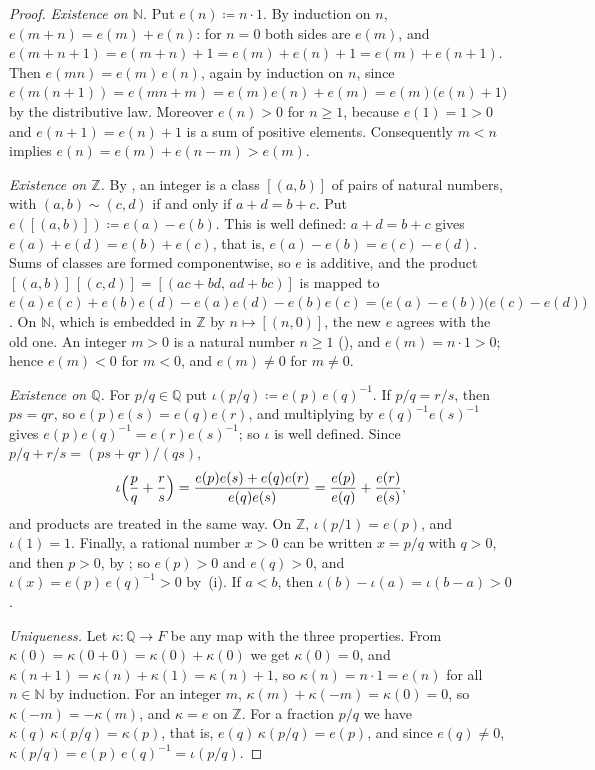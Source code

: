 \begin{proof}
\emph{Existence on $\mathbb N$.} Put $e(n)\coloneqq n\cdot1$. By induction on $n$, $e(m+n)=e(m)+e(n)$: for $n=0$ both sides are $e(m)$, and $e(m+n+1)=e(m+n)+1=e(m)+e(n)+1=e(m)+e(n+1)$. Then $e(mn)=e(m)\,e(n)$, again by induction on $n$, since $e(m(n+1))=e(mn+m)=e(m)e(n)+e(m)=e(m)\bigl(e(n)+1\bigr)$ by the distributive law. Moreover $e(n)>0$ for $n\ge1$, because $e(1)=1>0$ and $e(n+1)=e(n)+1$ is a sum of positive elements. Consequently $m<n$ implies $e(n)=e(m)+e(n-m)>e(m)$.

\emph{Existence on $\mathbb Z$.} By , an integer is a class $[(a,b)]$ of pairs of natural numbers, with $(a,b)\sim(c,d)$ if and only if $a+d=b+c$. Put $e([(a,b)])\coloneqq e(a)-e(b)$. This is well defined: $a+d=b+c$ gives $e(a)+e(d)=e(b)+e(c)$, that is, $e(a)-e(b)=e(c)-e(d)$. Sums of classes are formed componentwise, so $e$ is additive, and the product $[(a,b)]\,[(c,d)]=[(ac+bd,\,ad+bc)]$ is mapped to $e(a)e(c)+e(b)e(d)-e(a)e(d)-e(b)e(c)=\bigl(e(a)-e(b)\bigr)\bigl(e(c)-e(d)\bigr)$. On $\mathbb N$, which is embedded in $\mathbb Z$ by $n\mapsto[(n,0)]$, the new $e$ agrees with the old one. An integer $m>0$ is a natural number $n\ge1$ (), and $e(m)=n\cdot1>0$; hence $e(m)<0$ for $m<0$, and $e(m)\ne0$ for $m\ne0$.

\emph{Existence on $\mathbb Q$.} For $p/q\in\mathbb Q$ put $\iota(p/q)\coloneqq e(p)\,e(q)^{-1}$. If $p/q=r/s$, then $ps=qr$, so $e(p)e(s)=e(q)e(r)$, and multiplying by $e(q)^{-1}e(s)^{-1}$ gives $e(p)e(q)^{-1}=e(r)e(s)^{-1}$; so $\iota$ is well defined. Since $p/q+r/s=(ps+qr)/(qs)$,
\[
\iota\Bigl(\frac pq+\frac rs\Bigr)=\frac{e(p)e(s)+e(q)e(r)}{e(q)e(s)}=\frac{e(p)}{e(q)}+\frac{e(r)}{e(s)},
\]
and products are treated in the same way. On $\mathbb Z$, $\iota(p/1)=e(p)$, and $\iota(1)=1$. Finally, a rational number $x>0$ can be written $x=p/q$ with $q>0$, and then $p>0$, by ; so $e(p)>0$ and $e(q)>0$, and $\iota(x)=e(p)\,e(q)^{-1}>0$ by \,(i). If $a<b$, then $\iota(b)-\iota(a)=\iota(b-a)>0$.

\emph{Uniqueness.} Let $\kappa\colon\mathbb Q\to F$ be any map with the three properties. From $\kappa(0)=\kappa(0+0)=\kappa(0)+\kappa(0)$ we get $\kappa(0)=0$, and $\kappa(n+1)=\kappa(n)+\kappa(1)=\kappa(n)+1$, so $\kappa(n)=n\cdot1=e(n)$ for all $n\in\mathbb N$ by induction. For an integer $m$, $\kappa(m)+\kappa(-m)=\kappa(0)=0$, so $\kappa(-m)=-\kappa(m)$, and $\kappa=e$ on $\mathbb Z$. For a fraction $p/q$ we have $\kappa(q)\,\kappa(p/q)=\kappa(p)$, that is, $e(q)\,\kappa(p/q)=e(p)$, and since $e(q)\ne0$, $\kappa(p/q)=e(p)\,e(q)^{-1}=\iota(p/q)$.
\end{proof}

